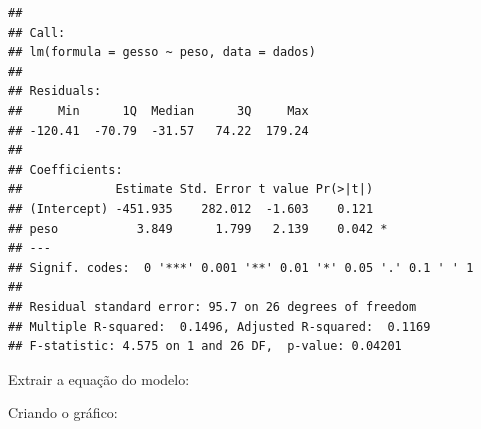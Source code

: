 \documentclass[
]{book}
\newenvironment{Shaded}{\begin{snugshade}}{\end{snugshade}}
\newcommand{\DataTypeTok}[1]{\textcolor[rgb]{0.13,0.29,0.53}{#1}}
\newcommand{\DecValTok}[1]{\textcolor[rgb]{0.00,0.00,0.81}{#1}}
\newcommand{\ErrorTok}[1]{\textcolor[rgb]{0.64,0.00,0.00}{\textbf{#1}}}
\newcommand{\KeywordTok}[1]{\textcolor[rgb]{0.13,0.29,0.53}{\textbf{#1}}}
\newcommand{\NormalTok}[1]{#1}
\newcommand{\OperatorTok}[1]{\textcolor[rgb]{0.81,0.36,0.00}{\textbf{#1}}}
\newcommand{\StringTok}[1]{\textcolor[rgb]{0.31,0.60,0.02}{#1}}
\begin{document}
\begin{verbatim}
## 
## Call:
## lm(formula = gesso ~ peso, data = dados)
## 
## Residuals:
##     Min      1Q  Median      3Q     Max 
## -120.41  -70.79  -31.57   74.22  179.24 
## 
## Coefficients:
##             Estimate Std. Error t value Pr(>|t|)  
## (Intercept) -451.935    282.012  -1.603    0.121  
## peso           3.849      1.799   2.139    0.042 *
## ---
## Signif. codes:  0 '***' 0.001 '**' 0.01 '*' 0.05 '.' 0.1 ' ' 1
## 
## Residual standard error: 95.7 on 26 degrees of freedom
## Multiple R-squared:  0.1496, Adjusted R-squared:  0.1169 
## F-statistic: 4.575 on 1 and 26 DF,  p-value: 0.04201
\end{verbatim}

Extrair a equação do modelo:

\begin{Shaded}
\end{Shaded}

Criando o gráfico:
\end{document}
